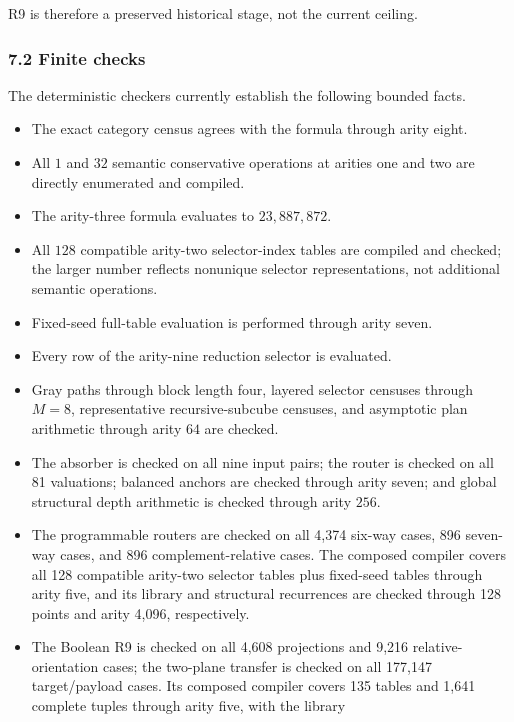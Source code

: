 \documentclass[
  11pt,
]{article}
\providecommand{\tightlist}{%
  \setlength{\itemsep}{0pt}\setlength{\parskip}{0pt}}
\theoremstyle{definition}
\theoremstyle{remark}
\begin{document}
R9 is therefore a preserved historical stage, not the current ceiling.

\hypertarget{finite-checks}{%
\subsubsection{7.2 Finite checks}\label{finite-checks}}

The deterministic checkers currently establish the following bounded
facts.

\begin{itemize}
\tightlist
\item
  The exact category census agrees with the formula through arity eight.
\item
  All \(1\) and \(32\) semantic conservative operations at arities one
  and two are directly enumerated and compiled.
\item
  The arity-three formula evaluates to \(23,887,872\).
\item
  All \(128\) compatible arity-two selector-index tables are compiled
  and checked; the larger number reflects nonunique selector
  representations, not additional semantic operations.
\item
  Fixed-seed full-table evaluation is performed through arity seven.
\item
  Every row of the arity-nine reduction selector is evaluated.
\item
  Gray paths through block length four, layered selector censuses
  through \(M=8\), representative recursive-subcube censuses, and
  asymptotic plan arithmetic through arity \(64\) are checked.
\item
  The absorber is checked on all nine input pairs; the router is checked
  on all 81 valuations; balanced anchors are checked through arity
  seven; and global structural depth arithmetic is checked through arity
  \(256\).
\item
  The programmable routers are checked on all 4,374 six-way cases, 896
  seven-way cases, and 896 complement-relative cases. The composed
  compiler covers all 128 compatible arity-two selector tables plus
  fixed-seed tables through arity five, and its library and structural
  recurrences are checked through 128 points and arity 4,096,
  respectively.
\item
  The Boolean R9 is checked on all 4,608 projections and 9,216
  relative-orientation cases; the two-plane transfer is checked on all
  177,147 target/payload cases. Its composed compiler covers 135 tables
  and 1,641 complete tuples through arity five, with the library

\end{itemize}
\end{document}
